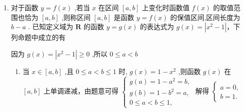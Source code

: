 \begin{enumerate}
    \begin{jieda}
        $\dfrac{(a+1)x - \dfrac{1}{a}}{ax} = \dfrac{a+1}{a} - \dfrac{1}{a^2x}$，故函数为$y = \dfrac{a+1}{a} - \dfrac{1}{a^2x} (a \neq 0)$，易知函数的定义域为$(-\infty, 0) \cup (0, +\infty)$，故必有$m < n < 0$或$0 < m < n$. 故易知函数在$[m, n]$内严格单调递增，故$\left \{ \begin{array}{l}
                \dfrac{a+1}{a} - \dfrac{1}{a^2m} = m \\
                \dfrac{a+1}{a} - \dfrac{1}{a^2n} = n
            \end{array} \right.$，即$m, n$是$a^2x^2 - (a+1)ax + 1 = 0$的两根. 由韦达定理有$\left \{ \begin{array}{l}
                m+n = \dfrac{a+1}{a}\\
                m \cdot n = \dfrac{1}{a^2}
            \end{array} \right.$，由$\Delta > 0$得$((a+1)^2 - 4)a^2 > 0$，故$a \in (-\infty, -3]\cup [1, +\infty)$ \\
            $n - m = \sqrt{(m+n)^2 - 4mn} = \sqrt{(\dfrac{a+1}{a})^2 - \dfrac{4}{a^2}} = \sqrt{\dfrac{a^2+2a-3}{a^2}} \leq \dfrac{2\sqrt{3}}{3}$，当$a = 3$时取等号.
    \end{jieda}
    \item 对于函数 $y = f\left( x\right)$ ,若当 $x$ 在区间 $\left\lbrack  {a,b}\right\rbrack$ 上变化时函数值 $f\left( x\right)$ 的取值范围也恰为 $\left\lbrack  {a,b}\right\rbrack$ ,则称区间 $\left\lbrack  {a,b}\right\rbrack$ 是函数 $y = f\left( x\right)$ 的保值区间,区间长度为 $b - a$ . 已知定义域为 $\mathbf{R}$ 的函数 $y = g\left( x\right)$ 的表达式为 $g\left( x\right)  = \left| {{x}^{2} - 1}\right|$，下列命题中成立的有
    \begin{jieda}
        因为 $g\left( x\right)  = \left| {{x}^{2} - 1}\right|  \geq  0$ ,所以 $0 \leq  a < b$
        \begin{enumerate}
            \item 当 $x \in  \left\lbrack  {a,b}\right\rbrack$ ,且 $0 \leq  a < b \leq  1$ 时, $g\left( x\right)  = 1 - {x}^{2}$ ,则函数 $g\left( x\right)$ 在 $\left\lbrack  {a,b}\right\rbrack$ 上单调递减，由题意可得 $\left\{  \begin{array}{l} g\left( a\right)  = 1 - {a}^{2} = b, \\  g\left( b\right)  = 1 - {b}^{2} = a, \\  0 \leq  a < b \leq  1, \end{array}\right.$ 解得 $\left\{  \begin{array}{l} a = 0, \\  b = 1. \end{array}\right.$

\end{enumerate}
\end{jieda}
\end{enumerate}
